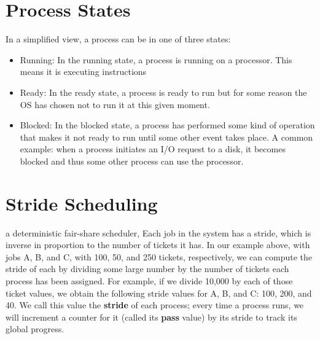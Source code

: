 \section*{Process States}
In a simplified view, a process can be in one of three states:
\begin{itemize}
\item Running: In the running state, a process is running on a processor. This means it is executing instructions
\item Ready: In the ready state, a process is ready to run but for some reason the OS has chosen not to run it at this given moment.
\item Blocked: In the blocked state, a process has performed some kind of operation that makes it not ready to run until some other event takes place. A common example: when a process initiates an I/O request to a disk, it becomes blocked and thus some other process can use the processor.
\end{itemize}
\section*{Stride Scheduling}
a deterministic fair-share scheduler, Each job in the system has a stride, which is inverse in proportion to the number of tickets it has. In our example above, with jobs A, B, and C, with 100, 50, and 250 tickets,
respectively, we can compute the stride of each by dividing some large number by the number of tickets each process has been assigned. For example, if we divide 10,000 by each of those ticket values, we obtain the following stride values for A, B, and C: 100, 200, and 40. We call this value the \textbf{stride} of each process; every time a process runs, we will increment a counter for it (called its \textbf{pass} value) by its stride to track its global progress.

